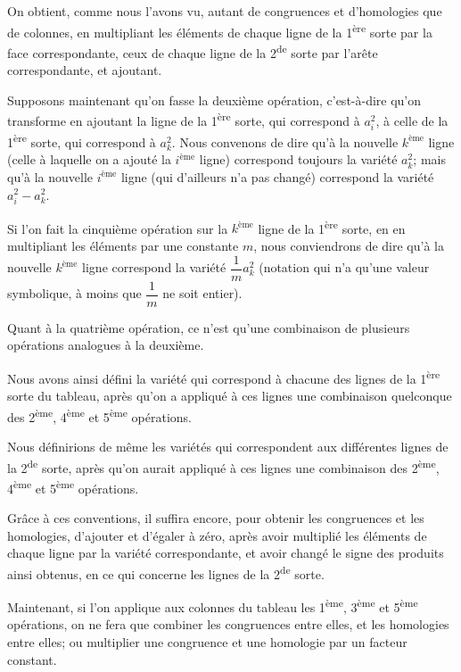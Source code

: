 \documentclass{article}
\begin{document}
On obtient, comme nous l'avons vu, autant de congruences et d'homologies que de colonnes, en multipliant les éléments de chaque ligne de la 1\textsuperscript{ère} sorte par la face correspondante, ceux de chaque ligne de la 2\textsuperscript{de} sorte par l'arête correspondante, et ajoutant.

Supposons maintenant qu'on fasse la deuxième opération, c'est-à-dire qu'on transforme en ajoutant la ligne de la 1\textsuperscript{ère} sorte, qui correspond à $a^{2}_{i}$, à celle de la 1\textsuperscript{ère} sorte, qui correspond à $a^{2}_{k}$. Nous convenons de dire qu'à la nouvelle $k^{\text{ème}}$ ligne (celle à laquelle on a ajouté la $i^{\text{ème}}$ ligne) correspond toujours la variété $a^{2}_{k}$; mais qu'à la nouvelle $i^{\text{ème}}$ ligne (qui d'ailleurs n'a pas changé) correspond la variété $a^{2}_{i} - a^{2}_{k}$.

Si l'on fait la cinquième opération sur la $k^{\text{ème}}$ ligne de la 1\textsuperscript{ère} sorte, en en multipliant les éléments par une constante $m$, nous conviendrons de dire qu'à la nouvelle $k^{\text{ème}}$ ligne correspond la variété $\dfrac{1}{m} a^{2}_{k}$ (notation qui n'a qu'une valeur symbolique, à moins que $\dfrac{1}{m}$ ne soit entier).

Quant à la quatrième opération, ce n'est qu'une combinaison de plusieurs opérations analogues à la deuxième.

Nous avons ainsi défini la variété qui correspond à chacune des lignes de la 1\textsuperscript{ère} sorte du tableau, après qu'on a appliqué à ces lignes une combinaison quelconque des 2\textsuperscript{ème}, 4\textsuperscript{ème} et 5\textsuperscript{ème} opérations.

Nous définirions de même les variétés qui correspondent aux différentes lignes de la 2\textsuperscript{de} sorte, après qu'on aurait appliqué à ces lignes une combinaison des 2\textsuperscript{ème}, 4\textsuperscript{ème} et 5\textsuperscript{ème} opérations.

Grâce à ces conventions, il suffira encore, pour obtenir les congruences et les homologies, d'ajouter et d'égaler à zéro, après avoir multiplié les éléments de chaque ligne par la variété correspondante, et avoir changé le signe des produits ainsi obtenus, en ce qui concerne les lignes de la 2\textsuperscript{de} sorte.

Maintenant, si l'on applique aux colonnes du tableau les 1\textsuperscript{ème}, 3\textsuperscript{ème} et 5\textsuperscript{ème} opérations, on ne fera que combiner les congruences entre elles, et les homologies entre elles; ou multiplier une congruence et une homologie par un facteur constant.
\end{document}
